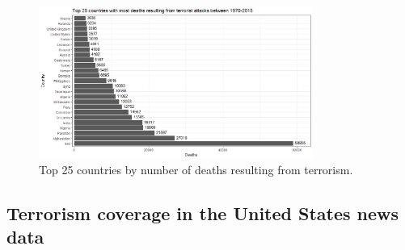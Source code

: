 \documentclass[10pt,a4paper]{article}
\begin{document}
\begin{center}
\begin{figure}[H]		
	\includegraphics[width=0.8\textwidth]{Plots/Top25countriesbydeaths.png}
	\caption{Top 25 countries by number of deaths resulting from terrorism.}
\end{figure}
\end{center}

\subsection{Terrorism coverage in the United States news data}
\end{document}
